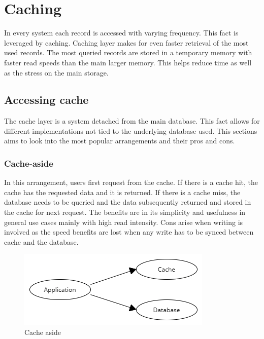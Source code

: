 \documentclass[10pt,twoside,a4paper]{article}
\begin{document}

\section{Caching}
In every system each record is accessed with varying frequency. This fact is leveraged by caching. Caching layer makes for even faster retrieval of the most used records. The most queried records are stored in a temporary memory with faster read speeds than the main larger memory. This helps reduce time as well as the stress on the main storage. \cite{10.1145/3009837.3009891}

\subsection{Accessing cache}
The cache layer is a system detached from the main database. This fact allows for different implementations not tied to the underlying database used. This sections aims to look into the most popular arrangements and their pros and cons.\cite{AWS}\cite{Prisma}

\subsubsection{Cache-aside}
\label{sec:cache-aside}
In this arrangement, users first request from the cache. If there is a cache hit, the cache has the requested data and it is returned. If there is a cache miss, the database needs to be queried and the data subsequently returned and stored in the cache for next request. The benefits are in its simplicity and usefulness in general use cases mainly with high read intensity. 
Cons arise when writing is involved as the speed benefits are lost when any write has to be synced between cache and the database.

\begin{figure}[h]
    \centering
    \includegraphics[width=0.5\linewidth]{Cache-aside.png}
    \caption{Cache aside}
    \label{fig:cache-aside}
\end{figure}
\end{document}
